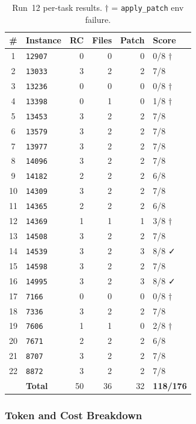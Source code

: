\begin{table}[h]
\centering
\small
\caption{Run~12 per-task results.  $\dagger$ = \texttt{apply\_patch} env failure.}\label{tab:r12-tasks}
\setlength{\tabcolsep}{4pt}
\begin{tabular}{clrrrl}
\toprule
\textbf{\#} & \textbf{Instance} & \textbf{RC} & \textbf{Files} & \textbf{Patch} & \textbf{Score} \\
\midrule
 1 & \texttt{12907} & 0 & 0 & 0 & 0/8 $\dagger$ \\
 2 & \texttt{13033} & 3 & 2 & 2 & 7/8 \\
 3 & \texttt{13236} & 0 & 0 & 0 & 0/8 $\dagger$ \\
 4 & \texttt{13398} & 0 & 1 & 0 & 1/8 $\dagger$ \\
 5 & \texttt{13453} & 3 & 2 & 2 & 7/8 \\
 6 & \texttt{13579} & 3 & 2 & 2 & 7/8 \\
 7 & \texttt{13977} & 3 & 2 & 2 & 7/8 \\
 8 & \texttt{14096} & 3 & 2 & 2 & 7/8 \\
 9 & \texttt{14182} & 2 & 2 & 2 & 6/8 \\
10 & \texttt{14309} & 3 & 2 & 2 & 7/8 \\
11 & \texttt{14365} & 2 & 2 & 2 & 6/8 \\
12 & \texttt{14369} & 1 & 1 & 1 & 3/8 $\dagger$ \\
13 & \texttt{14508} & 3 & 2 & 2 & 7/8 \\
14 & \texttt{14539} & 3 & 2 & 3 & 8/8 ✓ \\
15 & \texttt{14598} & 3 & 2 & 2 & 7/8 \\
16 & \texttt{14995} & 3 & 2 & 3 & 8/8 ✓ \\
17 & \texttt{7166}  & 0 & 0 & 0 & 0/8 $\dagger$ \\
18 & \texttt{7336}  & 3 & 2 & 2 & 7/8 \\
19 & \texttt{7606}  & 1 & 1 & 0 & 2/8 $\dagger$ \\
20 & \texttt{7671}  & 2 & 2 & 2 & 6/8 \\
21 & \texttt{8707}  & 3 & 2 & 2 & 7/8 \\
22 & \texttt{8872}  & 3 & 2 & 2 & 7/8 \\
\midrule
   & \textbf{Total} & 50 & 36 & 32 & \textbf{118/176} \\
\bottomrule
\end{tabular}
\end{table}

\subsubsection{Token and Cost Breakdown}

